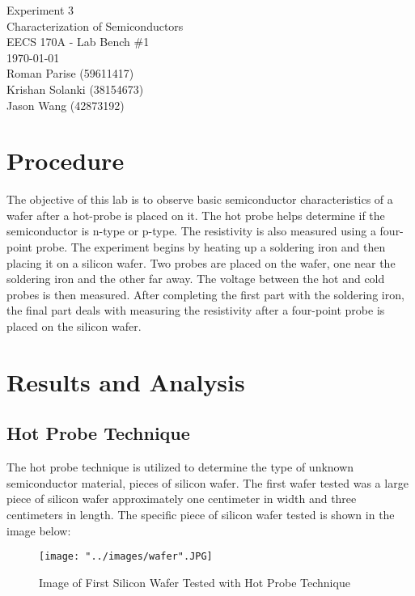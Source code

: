 \documentclass{article}
\begin{document}
	\begin{titlepage}
		\centering
		\Huge{Experiment 3} \\
		\huge{Characterization of Semiconductors} \\
		\vspace{1cm}
		\large{EECS 170A - Lab Bench \#1} \\
		\large{\today} \\
		\vspace{1cm}
		\normalsize{Roman Parise (59611417)} \\
		\normalsize{Krishan Solanki (38154673)} \\
		\normalsize{Jason Wang (42873192)} \\
	\end{titlepage}
	\section{Procedure}
The objective of this lab is to observe basic semiconductor characteristics of a wafer after a hot-probe is placed on it. The hot probe helps determine if the semiconductor is n-type or p-type. The resistivity is also measured using a four-point probe. The experiment begins by heating up a soldering iron and then placing it on a silicon wafer. Two probes are placed on the wafer, one near the soldering iron and the other far away. The voltage between the hot and cold probes is then measured. After completing the first part with the soldering iron, the final part deals with measuring the resistivity after a four-point probe is placed on the silicon wafer. \\

	\section{Results and Analysis}
	\subsection{Hot Probe Technique}
	The hot probe technique is utilized to determine the type of unknown semiconductor material, pieces of silicon wafer. The first wafer tested was a large piece of silicon wafer approximately one centimeter in width and three centimeters in length. The specific piece of silicon wafer tested is shown in the image below:

	\FloatBarrier
	
	\begin{figure}[h!]
		\centering
		\texttt{[image: "../images/wafer".JPG]}
		\caption{Image of First Silicon Wafer Tested with Hot Probe Technique}
		\label{fig:wafer}
	\end{figure}
\end{document}
